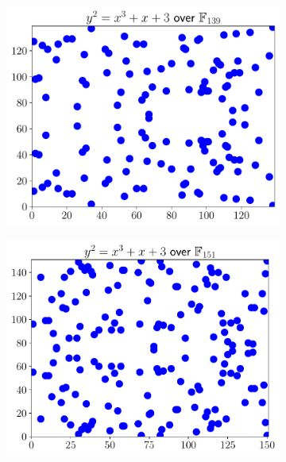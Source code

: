 \begin{figure}[p]
    \begin{subfigure}[t]{0.45\textwidth}
    \includegraphics[width=\textwidth]{plots/ec_finite/ec_finite_F_139_1_3.pdf}
    \end{subfigure}
    \begin{subfigure}[t]{0.45\textwidth}
    \includegraphics[width=\textwidth]{plots/ec_finite/ec_finite_F_151_1_3.pdf}
    \end{subfigure}


\end{figure}
